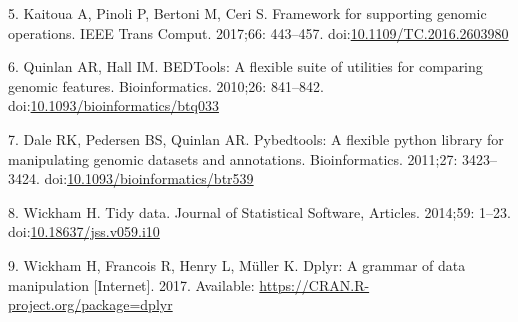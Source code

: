 \documentclass[10pt,letterpaper]{article}
\begin{document}
\leavevmode\hypertarget{ref-Kaitoua2017-pw}{}%
5. Kaitoua A, Pinoli P, Bertoni M, Ceri S. Framework for supporting
genomic operations. IEEE Trans Comput. 2017;66: 443--457.
doi:\href{https://doi.org/10.1109/TC.2016.2603980}{10.1109/TC.2016.2603980}

\leavevmode\hypertarget{ref-Quinlan2010-gc}{}%
6. Quinlan AR, Hall IM. BEDTools: A flexible suite of utilities for
comparing genomic features. Bioinformatics. 2010;26: 841--842.
doi:\href{https://doi.org/10.1093/bioinformatics/btq033}{10.1093/bioinformatics/btq033}

\leavevmode\hypertarget{ref-Dale2011-js}{}%
7. Dale RK, Pedersen BS, Quinlan AR. Pybedtools: A flexible python
library for manipulating genomic datasets and annotations.
Bioinformatics. 2011;27: 3423--3424.
doi:\href{https://doi.org/10.1093/bioinformatics/btr539}{10.1093/bioinformatics/btr539}

\leavevmode\hypertarget{ref-Wickham2014-jc}{}%
8. Wickham H. Tidy data. Journal of Statistical Software, Articles.
2014;59: 1--23.
doi:\href{https://doi.org/10.18637/jss.v059.i10}{10.18637/jss.v059.i10}

\leavevmode\hypertarget{ref-Wickham2017-dplyr}{}%
9. Wickham H, Francois R, Henry L, Müller K. Dplyr: A grammar of data
manipulation {[}Internet{]}. 2017. Available:
\url{https://CRAN.R-project.org/package=dplyr}

\nolinenumbers
\end{document}
